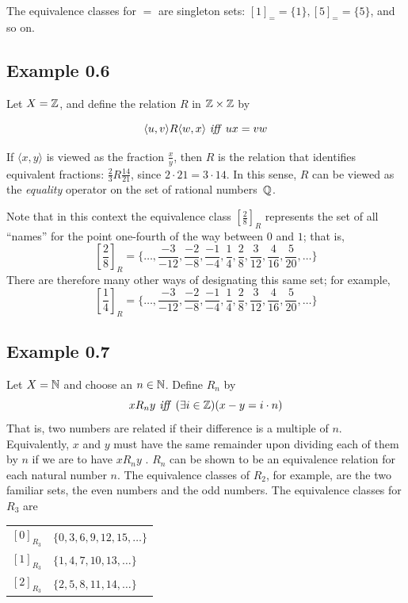 The equivalence classes for $=$ are singleton sets: $[1]_==\{1\},[5]_==\{5\}$,
and so on.

\subsection*{Example 0.6}

Let $X = \mathbb{Z}$, and define the relation $R$ in $\mathbb{Z}\times\mathbb{Z}$ by

\[\langle u, v\rangle R\langle w,x\rangle\ \text{\emph{iff}}\ ux = vw\]

If $\langle x, y\rangle$ is viewed as the fraction $\frac{x}{y}$, then $R$ is
the relation that identifies equivalent fractions: $\frac{2}{3}R\frac{14}{21}$,
since $2\cdot 21=3\cdot 14$. In this sense, $R$ can be viewed as the \emph{equality}
operator on the set of rational numbers~$\mathbb{Q}$.

Note that in this context the equivalence class $[\frac{2}{8}]_R$ represents the
set of all ``names'' for the point one-fourth of the way between $0$ and $1$;
that is,
\[\left[\frac{2}{8}\right]_R = \{\ldots ,\frac{-3}{-12}, \frac{-2}{-8},
\frac{-1}{-4}, \frac{1}{4},\frac{2}{8},\frac{3}{12},\frac{4}{16},\frac{5}{20},
\ldots \}\]
There are therefore many other ways of designating this same set; for example,
\[\left[\frac{1}{4}\right]_R = \{ \ldots , \frac{-3}{-12}, \frac{-2}{-8}, \frac{-1}{-4},
    \frac{1}{4},\frac{2}{8},\frac{3}{12},\frac{4}{16},\frac{5}{20}, \ldots \}\]

\subsection*{Example 0.7}

Let $X = \mathbb{N}$ and choose an $n \in \mathbb{N}$. Define $R_n$ by
\[x R_n y \text{\emph{ iff }}    (\exists i \in \mathbb{Z})(x - y = i\cdot n)\]
That is, two numbers are related if their difference is a multiple of $n$.
Equivalently, $x$ and $y$ must have the same remainder upon dividing each of
them by $n$ if we are to have $x R_n y$
.
$R_n$ can be shown to be an equivalence relation for each natural number $n$.
The equivalence classes of $R_2$, for example, are the two familiar sets, the
even numbers and the odd numbers. The equivalence classes for $R_3$ are
\begin{center}\begin{tabular}{r@{ $=$ }l}
$[0]_{R_3}$ & $\{0, 3, 6, 9, 12, 15, \ldots \}$ \\
$[1]_{R_3}$ & $\{1, 4,7,10,13, \ldots \}$ \\
$[2]_{R_3}$ & $\{2, 5, 8,11,14, \ldots \}$
\end{tabular}\end{center}

